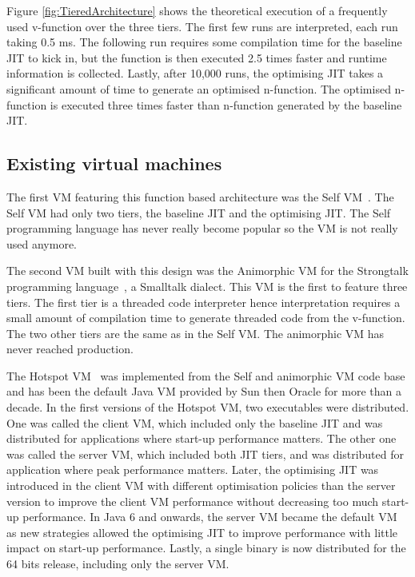 \documentclass[a4paper,12pt,twoside]{../includes/ThesisStyle}
\begin{document}
Figure \ref{fig:TieredArchitecture} shows the theoretical execution of a frequently used v-function over the three tiers. The first few runs are interpreted, each run taking 0.5 ms. The following run requires some compilation time for the baseline JIT to kick in, but the function is then executed 2.5 times faster and runtime information is collected. Lastly, after 10,000 runs, the optimising JIT takes a significant amount of time to generate an optimised n-function. The optimised n-function is executed three times faster than n-function generated by the baseline JIT.

\subsection{Existing virtual machines}
\label{sec:existing1}

The first VM featuring this function based architecture was the Self VM~\cite{UrsPHD}. The Self VM had only two tiers, the baseline JIT and the optimising JIT. The Self programming language has never really become popular so the VM is not really used anymore. 

The second VM built with this design was the Animorphic VM for the Strongtalk programming language~\cite{Sun06}, a Smalltalk dialect. This VM is the first to feature three tiers. The first tier is a threaded code interpreter hence interpretation requires a small amount of compilation time to generate threaded code from the v-function. The two other tiers are the same as in the Self VM. The animorphic VM has never reached production.

The Hotspot VM~\cite{Pale01a} was implemented from the Self and animorphic VM code base and has been the default Java VM provided by Sun then Oracle for more than a decade. In the first versions of the Hotspot VM, two executables were distributed. One was called the client VM, which included only the baseline JIT and was distributed for applications where start-up performance matters. The other one was called the server VM, which included both JIT tiers, and was distributed for application where peak performance matters. Later, the optimising JIT was introduced in the client VM with different optimisation policies than the server version to improve the client VM performance without decreasing too much start-up performance. In Java 6 and onwards, the server VM became the default VM as new strategies allowed the optimising JIT to improve performance with little impact on start-up performance. Lastly, a single binary is now distributed for the 64 bits release, including only the server VM. 
\end{document}
